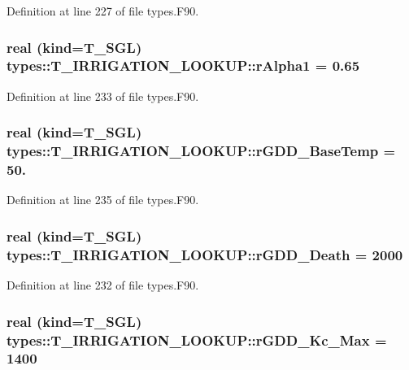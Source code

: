 Definition at line 227 of file types.F90.

\hypertarget{typetypes_1_1_t___i_r_r_i_g_a_t_i_o_n___l_o_o_k_u_p_a8c92049eb0a84f405b9923f184e67eac}{
\subsubsection[{rAlpha1}]{\setlength{\rightskip}{0pt plus 5cm}real (kind={\bf T\_\-SGL}) {\bf types::T\_\-IRRIGATION\_\-LOOKUP::rAlpha1} = 0.65}}
\label{typetypes_1_1_t___i_r_r_i_g_a_t_i_o_n___l_o_o_k_u_p_a8c92049eb0a84f405b9923f184e67eac}


Definition at line 233 of file types.F90.

\hypertarget{typetypes_1_1_t___i_r_r_i_g_a_t_i_o_n___l_o_o_k_u_p_a54f726a788b289484f93b69d8f1f4fcd}{
\subsubsection[{rGDD\_\-BaseTemp}]{\setlength{\rightskip}{0pt plus 5cm}real (kind={\bf T\_\-SGL}) {\bf types::T\_\-IRRIGATION\_\-LOOKUP::rGDD\_\-BaseTemp} = 50.}}
\label{typetypes_1_1_t___i_r_r_i_g_a_t_i_o_n___l_o_o_k_u_p_a54f726a788b289484f93b69d8f1f4fcd}


Definition at line 235 of file types.F90.

\hypertarget{typetypes_1_1_t___i_r_r_i_g_a_t_i_o_n___l_o_o_k_u_p_ab81656b40860757547ff176fc1c9cb55}{
\subsubsection[{rGDD\_\-Death}]{\setlength{\rightskip}{0pt plus 5cm}real (kind={\bf T\_\-SGL}) {\bf types::T\_\-IRRIGATION\_\-LOOKUP::rGDD\_\-Death} = 2000}}
\label{typetypes_1_1_t___i_r_r_i_g_a_t_i_o_n___l_o_o_k_u_p_ab81656b40860757547ff176fc1c9cb55}


Definition at line 232 of file types.F90.

\hypertarget{typetypes_1_1_t___i_r_r_i_g_a_t_i_o_n___l_o_o_k_u_p_a3e5670ad237b8c82a3e07d40fc4c9e5b}{
\subsubsection[{rGDD\_\-Kc\_\-Max}]{\setlength{\rightskip}{0pt plus 5cm}real (kind={\bf T\_\-SGL}) {\bf types::T\_\-IRRIGATION\_\-LOOKUP::rGDD\_\-Kc\_\-Max} = 1400}}
\label{typetypes_1_1_t___i_r_r_i_g_a_t_i_o_n___l_o_o_k_u_p_a3e5670ad237b8c82a3e07d40fc4c9e5b}



